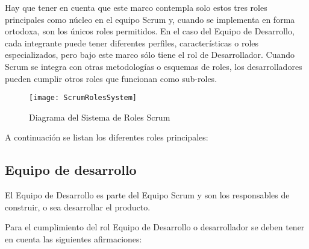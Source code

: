 Hay que tener en cuenta que este marco contempla solo estos tres roles principales como núcleo en el equipo Scrum y, cuando se implementa en forma ortodoxa, son los únicos roles permitidos. En el caso del Equipo de Desarrollo, cada integrante puede tener diferentes perfiles, características o roles especializados, pero bajo este marco sólo tiene el rol de Desarrollador. Cuando Scrum se integra con otras metodologías o esquemas de roles, los desarrolladores pueden cumplir otros roles que funcionan como sub-roles.

\begin{figure}[h]
  \centering
  \texttt{[image: ScrumRolesSystem]}
  \caption{Diagrama del Sistema de Roles Scrum}
  \centering
  \label{fig:ScrumRolesSystem} %
\end{figure}
\FloatBarrier

A continuación se listan los diferentes roles principales:

\subsection{Equipo de desarrollo}

El Equipo de Desarrollo es parte del Equipo Scrum y son los responsables de construir, o sea desarrollar el producto.
 
Para el cumplimiento del rol Equipo de Desarrollo o desarrollador se deben tener en cuenta las siguientes afirmaciones:

